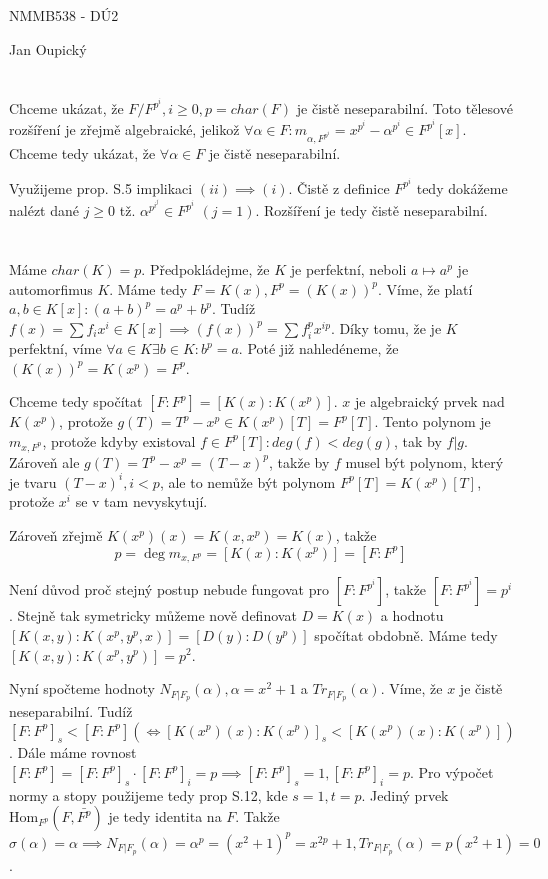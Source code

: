 \documentclass[12pt, a4paper]{article}
\begin{document}
\begin{center}
\large NMMB538 - DÚ2

\normalsize Jan Oupický
\end{center}
\vspace{1\baselineskip}

\section{}
Chceme ukázat, že $F/F^{p^i}, i \geq 0, p = char(F)$ je čistě neseparabilní. Toto tělesové rozšíření je zřejmě algebraické, jelikož $\forall \alpha \in F: m_{\alpha,F^{p^i}} = x^{p^i} - \alpha^{p^i} \in F^{p^i}[x]$. Chceme tedy ukázat, že $\forall \alpha \in F$ je čistě neseparabilní. 

Využijeme prop. S.5 implikaci $(ii) \implies (i)$. Čistě z definice $F^{p^i}$ tedy dokážeme nalézt dané $j \geq 0$ tž. $\alpha^{p^{i^{j}}} \in F^{p^i}$ $(j = 1)$. Rozšíření je tedy čistě neseparabilní.

\section{}
Máme $char(K) = p$. Předpokládejme, že $K$ je perfektní, neboli $a \mapsto a^p$ je automorfimus $K$. Máme tedy $F = K(x), F^p = (K(x))^p$. Víme, že platí $a,b \in K[x]: (a+b)^p = a^p + b^p$. Tudíž $f(x) = \sum f_ix^i \in K[x] \implies (f(x))^p = \sum f_i^p x^{ip}$. Díky tomu, že je $K$ perfektní, víme $\forall a \in K \exists b \in K: b^p = a$. Poté již nahledéneme, že $(K(x))^p = K(x^p) = F^p$.

Chceme tedy spočítat $[F:F^p]=[K(x):K(x^p)]$. $x$ je algebraický prvek nad $K(x^p)$, protože $g(T) = T^p - x^p \in K(x^p)[T] = F^p[T]$. Tento polynom je $m_{x,F^p}$, protože kdyby existoval $f \in F^p[T]: deg(f) < deg(g)$, tak by $f|g$. Zároveň ale $g(T)=T^p - x^p = (T-x)^p$, takže by $f$ musel být polynom, který je tvaru $(T-x)^i, i < p$, ale to nemůže být polynom $F^p[T]=K(x^p)[T]$, protože $x^i$ se v tam nevyskytují.

Zároveň zřejmě $K(x^p)(x)=K(x,x^p)=K(x)$, takže 
\[
p = \deg m_{x,F^p} = [K(x):K(x^p)] = [F:F^p]
\]

Není důvod proč stejný postup nebude fungovat pro $[F:F^{p^i}]$, takže $[F:F^{p^i}] = p^i$. Stejně tak symetricky můžeme nově definovat $D=K(x)$ a hodnotu $[K(x,y):K(x^p,y^p,x)]=[D(y):D(y^p)]$ spočítat obdobně. Máme tedy $[K(x,y):K(x^p,y^p)] = p^2$.

Nyní spočteme hodnoty $N_{F|F_p}(\alpha), \alpha=x^2+1$ a $Tr_{F|F_p}(\alpha)$. Víme, že $x$ je čistě neseparabilní. Tudíž $[F:F^p]_s < [F:F^p] (\iff [K(x^p)(x):K(x^p)]_s < [K(x^p)(x):K(x^p)])$. Dále máme rovnost $[F:F^p] = [F:F^p]_s \cdot [F:F^p]_i = p \implies [F:F^p]_s = 1, [F:F^p]_i = p$. Pro výpočet normy a stopy použijeme tedy prop S.12, kde $s=1, t=p$. Jediný prvek $\text{Hom}_{F^p}(F,\bar{F^p})$ je tedy identita na $F$. Takže $\sigma(\alpha)=\alpha \implies N_{F|F_p}(\alpha) = \alpha^p = (x^2+1)^p = x^{2p}+1, Tr_{F|F_p}(\alpha) = p(x^2+1) = 0$. 
\end{document}
